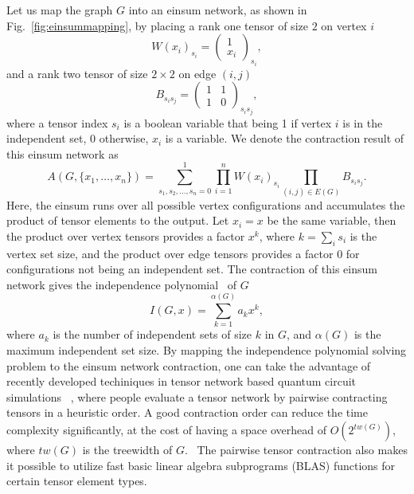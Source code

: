 \documentclass{article}
\newcommand{\<}{\langle}
\renewcommand{\>}{\rangle}
\renewcommand{\cite}[1]{{\citep{#1}}}
\newcommand{\Fig}[1]{Fig.~\ref{#1}}
\theoremstyle{definition}\newtheorem{definition}{\textit{Definition}}
\begin{document}
Let us map the graph $G$ into an einsum network, as shown in \Fig{fig:einsummapping}, by placing a rank one tensor of size $2$ on vertex $i$
\begin{equation}
    W(x_i)_{s_i} = \left(\begin{matrix}
        1 \\
        x_i
    \end{matrix}\right)_{s_i},
\end{equation}
and a rank two tensor of size $2 \times 2$ on edge $(i,j)$
\begin{equation}
    B_{s_i s_j} = \left(\begin{matrix}
        1  & 1\\
        1 & 0
    \end{matrix}\right)_{s_is_j},
\end{equation}
where a tensor index $s_i$ is a boolean variable that being 1 if vertex $i$ is in the independent set, 0 otherwise, $x_i$ is a variable.
We denote the contraction result of this einsum network as
\begin{equation}
    A(G, \{x_1,\ldots,x_n\}) = \sum\limits_{s_1, s_2, \ldots, s_n = 0}^{1} \prod\limits_{i=1}^n W(x_i)_{s_i} \prod\limits_{(i,j) \in E(G)} B_{s_i s_j}.
\end{equation}
Here, the einsum runs over all possible vertex configurations and accumulates the product of tensor elements to the output.
Let $x_i = x$ be the same variable, then the product over vertex tensors provides a factor $x^k$, where $k=\sum_i s_i$ is the vertex set size, 
and the product over edge tensors provides a factor $0$ for configurations not being an independent set.
The contraction of this einsum network gives the independence polynomial~\cite{Ferrin2014, Harvey2017} of $G$
\begin{equation}
I(G, x) = \sum_{k=1}^{\alpha(G)} a_k x^k,
\end{equation}
where $a_k$ is the number of independent sets of size $k$ in $G$, and $\alpha(G)$ is the maximum independent set size.
By mapping the independence polynomial solving problem to the einsum network contraction, one can take the advantage of recently developed techiniques in tensor network based quantum circuit simulations ~\cite{Gray2021,Pan2021},
where people evaluate a tensor network by pairwise contracting tensors in a heuristic order.
A good contraction order can reduce the time complexity significantly, at the cost of having a space overhead of $O(2^{tw(G)})$, where $tw(G)$ is the treewidth of $G$.~\cite{Markov2008}
The pairwise tensor contraction also makes it possible to utilize fast basic linear algebra subprograms (BLAS) functions for certain tensor element types.
\end{document}
